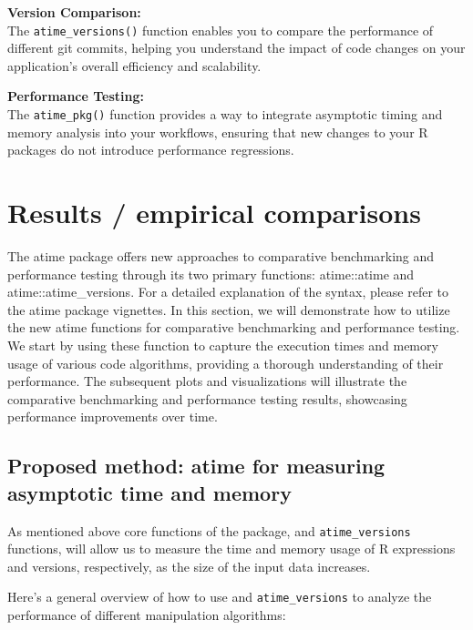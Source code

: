 \textbf{Version Comparison:} \\
The \texttt{atime\_versions()} function enables you to compare the performance of different git commits, helping you understand the impact of code changes on your application's overall efficiency and scalability.
\vspace{0.1in}

\textbf{Performance Testing:} \\
The \texttt{atime\_pkg()} function provides a way to integrate asymptotic timing and memory analysis into your workflows, ensuring that new changes to your R packages do not introduce performance regressions.
\vspace{0.1in}



\section{Results / empirical comparisons}

\noindent The atime package offers new approaches to comparative benchmarking and performance testing through its two primary functions: atime::atime and atime::atime\_versions. For a detailed explanation of the syntax, please refer to the atime package vignettes. In this section, we will demonstrate how to utilize the new atime functions for comparative benchmarking and performance testing. We start by using these function to capture the execution times and memory usage of various code algorithms, providing a thorough understanding of their performance. The subsequent plots and visualizations will illustrate the comparative benchmarking and performance testing results, showcasing performance improvements over time.\\


\subsection{Proposed method: atime for measuring asymptotic time and memory}

\noindent As mentioned above core functions of the  package,  and \texttt{atime\_versions} functions, will allow us to measure the time and memory usage of R expressions and versions, respectively, as the size of the input data increases.

\noindent Here's a general overview of how to use  and \texttt{atime\_versions} to analyze the performance of different manipulation algorithms:\\

